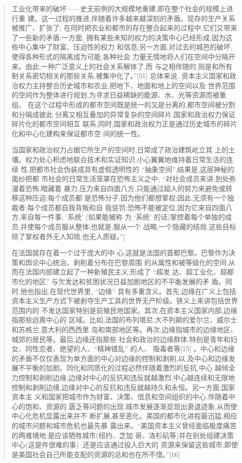 \begin{quotation}
工业化带来的破坏——史无前例的大规模地重建,即在整个社会的规模上进行重
建。这一过程的推进,伴随着许多越来越深刻的矛盾。现存的生产关系被推广、扩张了;
在同时把农业和都市的存在整合起来的过程中,它们又带来了一些新的矛盾:一方面,
拥有某些未知的权力的决策中心已经形成,因为这些中心集中了财富、压迫性的权力
和信息;另一方面,对过去的城邑的破坏,使得各种形式的隔离成为可能,各种社会
力量无情地将人们在空间中分隔开来。由此,一种广泛意义上的社会关系解体了,而
与之相伴随的,则是和所有制关系密切相关的那些关系,被集中化了。”[51] 总体来说,
资本主义国家和政治权力主持整合历史城市和农业,把地下、地面和地上的空间以及
世界范围的空间作为整体进行规划,为寻求日益稀缺的能源、水、光等资源而被重组。
在这个过程中形成的都市空间既是统一的又是分离的,都市空间被分割和分隔成彼此
分离又相互叠加的异常复杂的空间碎片,国家和政治权力保证碎片化的都市空间相互
联系,同时,国家和政治权力正是通过历史城市的碎片化和中心化建构来保证都市空
间的统一性。

当国家和政治权力占据它所生产的空间时,日常成了政治建筑屹立其
上的土壤。权力处心积虑地联合技术和实证知识,小心翼翼地维持着日常生活的连续
性,把都市社会伪装成具有虚假透明性的 “抽象空间”,结果是,这层神秘的面纱把都
市社会的日常生活笼罩在恐怖主义之中, “对社会成员来讲,到处弥漫着恐怖,暗藏着
暴力,压力来自四面八方,只能通过超人的努力来避免或转移这种压迫;每个成员都
是恐怖分子,因为他们都想掌权;因此,无须有一个独裁者;每个成员都自我背叛和自
我惩罚;恐怖不能被定位,因为它来自四面八方,来自每一件事; ‘系统’ (如果能被称
为 ‘系统’ 的话)掌控着每个单独的成员,并使每个成员服从整体,也就是,服从一个
战略,一个隐藏的结局,这些目标除了掌权者外无人知晓,也无人质疑。”[

在法国就存在着一个过于庞大的中
心,这就是法国的首都巴黎。巴黎作为决策和舆论中心统治、剥削着分布在巴黎周围
的从属性和被等级化的空间,从而在法国内部建立起了一种新殖民主义,形成了 “超发
达、超工业化、超都市化的地区” 与欠发达和贫困状况日益加剧地区的不平衡发展的矛
盾。同时,他也指出,在现代世界里, “边缘” 具有多重含义。首先,边缘在广义上包括
资本主义生产方式下被剥夺生产工具的世界无产阶级。狭义上来讲包括世界范围内的
不发达国家特别是前殖民地国家。其次,在资本主义国家内部,边缘指那些远离中心的
区域。比如,法国的布列塔尼,大不列颠的爱尔兰、威尔士和苏格兰,意大利的西西里
岛和南部地区等。再次,边缘指城市的边缘地区、城郊的居民等。最后,边缘还指那些
社会和政治的边缘群体,特别是青年和妇女、同性恋者、绝望的人、“精神错乱” 的人、
吸毒者等[15] 。中心和边缘的矛盾不仅仅表现为单方面的中心对边缘的控制和剥削,以
及中心和边缘发展不平衡的加剧。同化和同质化的过程必然伴随着激烈的反抗,中心
越倾全力控制和剥削边缘,边缘对中心的反抗和违反就越激烈,中心越连续和无限地
控制和剥削边缘,边缘对中心的反抗和违反就越持久和永恒。另一方面,国家资本主
义和国家把城市作为财富、决策、信息和空间组织的中心,伴随着中心的饱和、资源的
匮乏等问题的出现,城市发展逐渐显现出衰退迹象,从而使中心化危机显露出来并不
断扩展,甚至恶化。美国的都市化进程最迅猛,相应的城市问题和城市危机也最先暴
露出来。“美国资本主义曾经面临极度痛苦的两难境地:是应该牺牲城市(纽约、芝加
哥、洛杉矶等)并在别处组建决策中心(这是件很难的事)
 ,还是应该通过投入巨大的
资源来保留这些城市,即使是美国社会自己所能支配的资源的总和也在所不惜。”[16]


\end{quotation}
